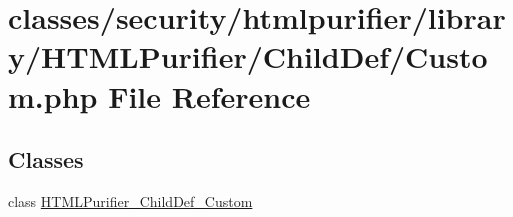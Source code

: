 \hypertarget{Custom_8php}{\section{classes/security/htmlpurifier/library/\+H\+T\+M\+L\+Purifier/\+Child\+Def/\+Custom.php File Reference}
\label{Custom_8php}
}
\subsection*{Classes}
\begin{DoxyCompactItemize}
\item 
class \hyperlink{classHTMLPurifier__ChildDef__Custom}{H\+T\+M\+L\+Purifier\+\_\+\+Child\+Def\+\_\+\+Custom}
\end{DoxyCompactItemize}
